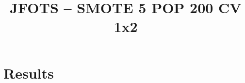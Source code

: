 \documentclass{llncs}
\title{JFOTS -- SMOTE 5 POP 200 CV 1x2}
\begin{document}
\maketitle

\section{Results}
















\end{document}
